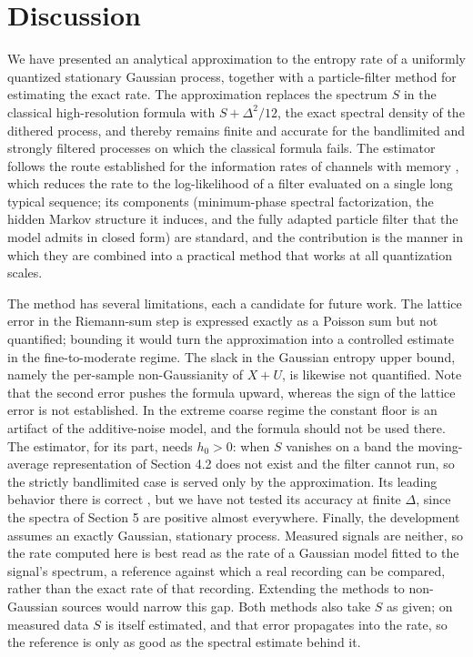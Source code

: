 \documentclass[11pt]{article}
\begin{document}
\section{Discussion}\label{discussion}

We have presented an analytical approximation to the entropy rate of a uniformly quantized stationary Gaussian process, together with a particle-filter method for estimating the exact rate. The approximation replaces the spectrum \(S\) in the classical high-resolution formula with \(S + \Delta^2/12\), the exact spectral density of the dithered process, and thereby remains finite and accurate for the bandlimited and strongly filtered processes on which the classical formula fails. The estimator follows the route established for the information rates of channels with memory \cite{ArnoldEtAl2006,DauwelsLoeliger2008}, which reduces the rate to the log-likelihood of a filter evaluated on a single long typical sequence; its components (minimum-phase spectral factorization, the hidden Markov structure it induces, and the fully adapted particle filter that the model admits in closed form) are standard, and the contribution is the manner in which they are combined into a practical method that works at all quantization scales.

The method has several limitations, each a candidate for future work. The lattice error in the Riemann-sum step is expressed exactly as a Poisson sum but not quantified; bounding it would turn the approximation into a controlled estimate in the fine-to-moderate regime. The slack in the Gaussian entropy upper bound, namely the per-sample non-Gaussianity of \(X + U\), is likewise not quantified. Note that the second error pushes the formula upward, whereas the sign of the lattice error is not established. In the extreme coarse regime the constant floor is an artifact of the additive-noise model, and the formula should not be used there. The estimator, for its part, needs \(h_0 > 0\): when \(S\) vanishes on a band the moving-average representation of Section 4.2 does not exist and the filter cannot run, so the strictly bandlimited case is served only by the approximation. Its leading behavior there is correct \cite{GeigerKoch2019}, but we have not tested its accuracy at finite \(\Delta\), since the spectra of Section 5 are positive almost everywhere. Finally, the development assumes an exactly Gaussian, stationary process. Measured signals are neither, so the rate computed here is best read as the rate of a Gaussian model fitted to the signal's spectrum, a reference against which a real recording can be compared, rather than the exact rate of that recording. Extending the methods to non-Gaussian sources would narrow this gap. Both methods also take \(S\) as given; on measured data \(S\) is itself estimated, and that error propagates into the rate, so the reference is only as good as the spectral estimate behind it.
\end{document}
